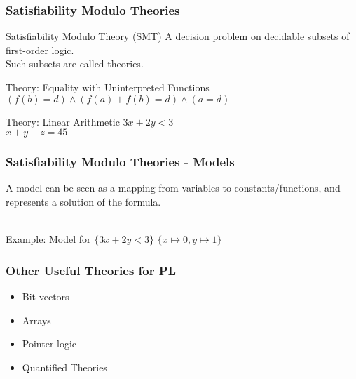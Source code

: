 \documentclass{beamer}
\makeatletter
\newcommand{\hl}{\textcolor{fibeamer@darkColor1}}
\theoremstyle{definition} %
\makeatother
\begin{document}
\begin{frame}
    \frametitle{Satisfiability Modulo Theories}

    \begin{block}{Satisfiability Modulo Theory (SMT)}
		A decision problem on \hl{decidable subsets} of first-order logic.\\
		Such subsets are called \hl{theories}.
    \end{block}

	\begin{exampleblock}{Theory: Equality with Uninterpreted Functions}
        $(f(b) = d) \wedge (f(a) + f(b) = d) \wedge (a = d)$
    \end{exampleblock}

    \pause

    \begin{exampleblock}{Theory: Linear Arithmetic}
        $3x + 2y < 3$\\
        $x + y + z = 45$
    \end{exampleblock}
\end{frame}

\begin{frame}
    \frametitle{Satisfiability Modulo Theories - Models}

    A model can be seen as a mapping from variables to constants/functions, and represents
		a solution of the formula.\\~\\

		\begin{exampleblock}{Example: Model for $\{3x + 2y < 3\}$}
				$\{ x \mapsto 0, y \mapsto 1\}$
		\end{exampleblock}

\end{frame}

\begin{frame}
    \frametitle{Other Useful Theories for PL}

    \begin{itemize}
        \item Bit vectors
        \item Arrays
        \item Pointer logic
        \item Quantified Theories
    \end{itemize}
\end{frame}
\end{document}
